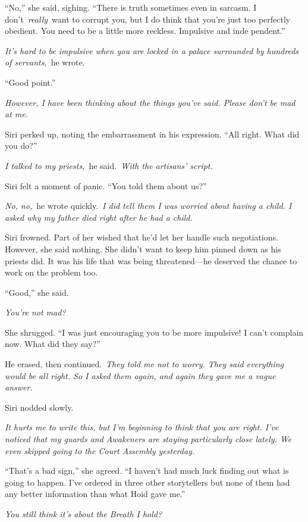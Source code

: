 “No,” she said, sighing. “There is truth sometimes even in sarcasm. I don’t~\textit{really}~want to corrupt you, but I do think that you’re just too perfectly obedient. You need to be a little more reckless. Impulsive and inde pendent.”

\textit{It’s hard to be impulsive when you are locked in a palace surrounded by hundreds of servants,}~he wrote.

“Good point.”

\textit{However, I have been thinking about the things you’ve said. Please don’t be mad at me.}

Siri perked up, noting the embarrassment in his expression. “All right. What did you do?”

\textit{I talked to my priests,}~he said.~\textit{With the artisans’ script.}

Siri felt a moment of panic. “You told them about us?”

\textit{No, no,}~he wrote quickly.~\textit{I did tell them I was worried about having a child. I asked why my father died right after he had a child.}

Siri frowned. Part of her wished that he’d let her handle such negotiations. However, she said nothing. She didn’t want to keep him pinned down as his priests did. It was his life that was being threatened—he deserved the chance to work on the problem too.

“Good,” she said.

\textit{You’re not mad?}

She shrugged. “I was just encouraging you to be more impulsive! I can’t complain now. What did they say?”

He erased, then continued.~\textit{They told me not to worry. They said everything would be all right. So I asked them again, and again they gave me a vague answer.}

Siri nodded slowly.

\textit{It hurts me to write this, but I’m beginning to think that you are right. I’ve noticed that my guards and Awakeners are staying particularly close lately. We even skipped going to the Court Assembly yesterday.}

“That’s a bad sign,” she agreed. “I haven’t had much luck finding out what is going to happen. I’ve ordered in three other storytellers but none of them had any better information than what Hoid gave me.”

\textit{You still think it’s about the Breath I hold?}

